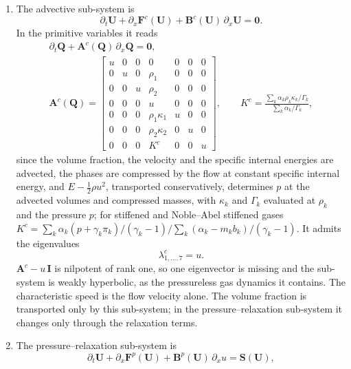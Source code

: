 \begin{enumerate}
\item The advective sub-system is
\begin{equation}
\partial_t\mathbf U+\partial_x\mathbf F^c(\mathbf U)+\mathbf B^c(\mathbf U)\,\partial_x\mathbf U=\mathbf 0 .
\label{eq:advective}
\end{equation}
In the primitive variables it reads
\begin{equation}
\begin{gathered}
\partial_t\mathbf Q+\mathbf A^c(\mathbf Q)\,\partial_x\mathbf Q=\mathbf 0,\\
\mathbf A^c(\mathbf Q)=\begin{bmatrix}
u&0&0&0&0&0&0\\
0&u&0&\rho_1&0&0&0\\
0&0&u&\rho_2&0&0&0\\
0&0&0&u&0&0&0\\
0&0&0&\rho_1\kappa_1&u&0&0\\
0&0&0&\rho_2\kappa_2&0&u&0\\
0&0&0&K^c&0&0&u
\end{bmatrix},\qquad
K^c=\frac{\sum_k\alpha_k\rho_k\kappa_k/\Gamma_k}{\sum_k\alpha_k/\Gamma_k},
\end{gathered}
\label{eq:Ac}
\end{equation}
since the volume fraction, the velocity and the specific internal energies are advected, the phases are compressed by
the flow at constant specific internal energy, and $E-\tfrac12\rho u^2$, transported conservatively, determines $p$ at the advected
volumes and compressed masses, with $\kappa_k$ and $\Gamma_k$ evaluated at $\rho_k$ and the pressure $p$; for stiffened and Noble--Abel stiffened gases $K^c=\sum_k\alpha_k(p+\gamma_k\pi_k)/(\gamma_k-1)\big/\sum_k(\alpha_k-m_kb_k)/(\gamma_k-1)$.
It admits the eigenvalues
\begin{equation}
\lambda^c_{1,\dots,7}=u .
\label{eq:eig_adv}
\end{equation}
$\mathbf A^c-u\,\mathbf I$ is nilpotent of rank one, so one eigenvector is missing and the sub-system is weakly hyperbolic, as
the pressureless gas dynamics it contains. The characteristic speed is the flow velocity alone. The volume fraction
is transported only by this sub-system; in the pressure--relaxation sub-system it changes only through the relaxation
terms.
\item The pressure--relaxation sub-system is
\begin{equation}
\partial_t\mathbf U+\partial_x\mathbf F^p(\mathbf U)+\mathbf B^p(\mathbf U)\,\partial_xu=\mathbf S(\mathbf U),

\end{equation}
\end{enumerate}
